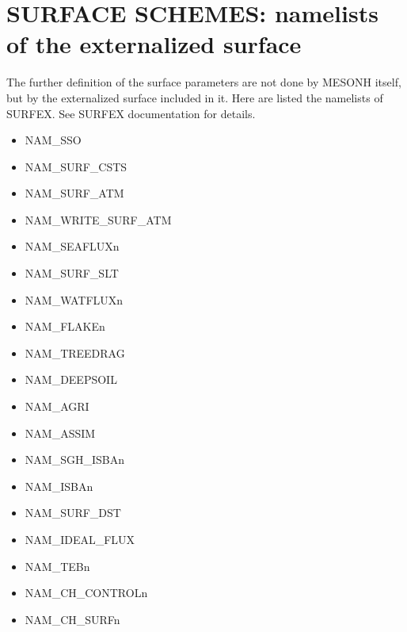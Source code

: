 


\section{SURFACE SCHEMES: namelists of the externalized surface}
\label{ss:surf}

The further definition of the surface parameters are not done by MESONH itself, but by the externalized surface included in it. 
Here are listed the namelists of SURFEX. See SURFEX documentation for details.

\begin{itemize}
\item NAM\_SSO
\item NAM\_SURF\_CSTS
\item NAM\_SURF\_ATM
\item NAM\_WRITE\_SURF\_ATM
\item NAM\_SEAFLUXn
\item NAM\_SURF\_SLT
\item NAM\_WATFLUXn
\item NAM\_FLAKEn
\item NAM\_TREEDRAG
\item NAM\_DEEPSOIL
\item NAM\_AGRI
\item NAM\_ASSIM
\item NAM\_SGH\_ISBAn
\item NAM\_ISBAn
\item NAM\_SURF\_DST
\item NAM\_IDEAL\_FLUX
\item NAM\_TEBn
\item NAM\_CH\_CONTROLn
\item NAM\_CH\_SURFn

\end{itemize}
